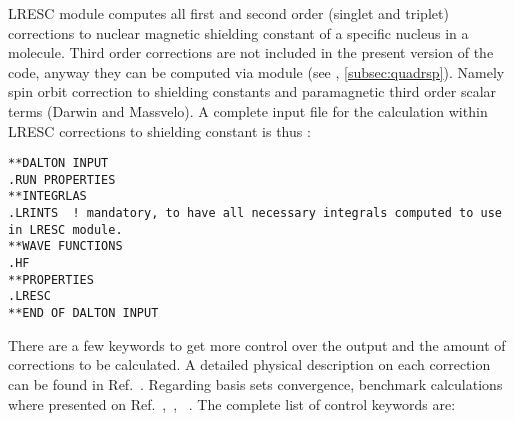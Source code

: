 \begin{center}
\end{center}

LRESC module computes all first and second order (singlet and triplet) corrections to nuclear magnetic shielding constant of a specific nucleus in a molecule. 
Third order corrections are not included in the present version of the code, anyway they can be computed via  module (see , \ref{subsec:quadrsp}). Namely spin orbit correction to shielding constants and paramagnetic third order scalar terms (Darwin and Massvelo). A complete input file for the calculation within LRESC corrections to shielding constant is thus :

\begin{verbatim}
**DALTON INPUT
.RUN PROPERTIES
**INTEGRLAS 
.LRINTS  ! mandatory, to have all necessary integrals computed to use in LRESC module.
**WAVE FUNCTIONS
.HF
**PROPERTIES
.LRESC
**END OF DALTON INPUT
\end{verbatim}


There are a few keywords to get more control over the output and the amount of corrections to be calculated. A detailed physical description on each correction can be found in Ref.~\cite{melomaldojcp12}. Regarding basis sets convergence, benchmark calculations where presented on Ref.~\cite{melomaldojcp12},~\cite{melomaldotca11},~\cite{melo2jcp03} . The complete list of control keywords are:


